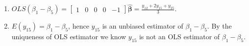 \documentclass{article}
\begin{document}
\begin{enumerate}[leftmargin = 0 em, label = \arabic*., font = \bfseries]
\begin{enumerate}
		\item 
		$OLS(\beta_1 - \beta_5) = \begin{bmatrix}
			1 & 0 & 0 & 0 & -1
		\end{bmatrix}\hat{\bm \beta} = \frac{y_{12} + 2 y_{15} + y_{25}}{3}$.


		\item 
		$E(y_{15}) = \beta_1 - \beta_5$, hence $y_{15}$ is an unbiased estimator of $\beta_1 - \beta_5$. By the uniqueness of OLS estimator we know $y_{15}$ is not an OLS estimator of $\beta_1 - \beta_5$.
	\end{enumerate}
	

	

	

	
	





 	\end{enumerate}


	
	
	
	
\end{document}
